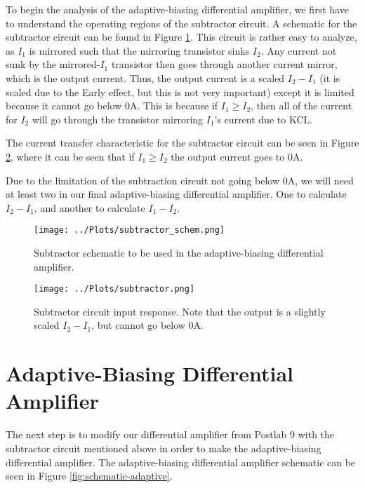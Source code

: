 \documentclass{article}
\begin{document}
    To begin the analysis of the adaptive-biasing differential amplifier, we first have to understand the operating regions of the subtractor circuit. A schematic for the subtractor circuit can be found in Figure \ref{fig:subtractor_schem}. This circuit is rather easy to analyze, as $I_1$ is mirrored such that the mirroring transistor sinks $I_2$. Any current not sunk by the mirrored-$I_1$ transistor then goes through another current mirror, which is the output current. Thus, the output current is a scaled $I_2 - I_1$ (it is scaled due to the Early effect, but this is not very important) except it is limited because it cannot go below $0$A. This is because if $I_1 \ge I_2$, then all of the current for $I_2$ will go through the transistor mirroring $I_1$'s current due to KCL.

    The current transfer characteristic for the subtractor circuit can be seen in Figure \ref{fig:subtractor_input}, where it can be seen that if $I_1 \ge I_2$ the output current goes to $0$A.

    Due to the limitation of the subtraction circuit not going below $0$A, we will need at least two in our final adaptive-biasing differential amplifier. One to calculate $I_2 - I_1$, and another to calculate $I_1 - I_2$. 

    \begin{figure}[htp]
        \centering
        \texttt{[image: ../Plots/subtractor\_schem.png]}
        \caption{Subtractor schematic to be used in the adaptive-biasing differential amplifier.}
        \label{fig:subtractor_schem}
    \end{figure}

    \begin{figure}[htp]
        \centering
        \texttt{[image: ../Plots/subtractor.png]}
        \caption{Subtractor circuit input response.  Note that the output is a slightly scaled $I_2 - I_1$, but cannot go below $0$A.}
        \label{fig:subtractor_input}
    \end{figure}


\newpage
\section{Adaptive-Biasing Differential Amplifier}

    The next step is to modify our differential amplifier from Postlab 9 with the subtractor circuit mentioned above in order to make the adaptive-biasing differential amplifier. The adaptive-biasing differential amplifier schematic can be seen in Figure \ref{fig:schematic-adaptive}.
\end{document}
